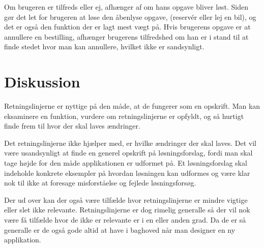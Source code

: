 \documentclass[a4paper]{article}
\begin{document}
Om brugeren er tilfreds eller ej, afhænger af om hans opgave bliver løst. Siden
gør det let for brugeren at løse den åbenlyse opgave, (reservér eller lej en
bil), og det er også den funktion der er lagt mest vægt på. Hvis brugerens
opgave er at annullere en bestilling, afhænger brugerens tilfredshed om han er i
stand til at finde stedet hvor man kan annullere, hvilket ikke er sandsynligt.

\section{Diskussion}

Retningslinjerne er nyttige på den måde, at de fungerer som en opskrift. Man kan
eksaminere en funktion, vurdere om retningslinjerne er opfyldt, og så hurtigt 
finde frem til hvor der skal laves ændringer. 

Det retningslinjerne ikke hjælper med, er hvilke ændringer der skal laves. 
Det vil være usandsynligt at finde en generel opskrift på løsningsforslag, 
fordi man skal tage højde for den måde applikationen er udformet på. Et 
løsningsforslag skal indeholde konkrete eksempler på hvordan løsningen
kan udformes og være klar nok til ikke at foresage misforståelse og 
fejlede løsningsforsøg.

Der ud over kan der også være tilfælde hvor retningslinjerne er mindre
vigtige eller slet ikke relevante. Retningslinjerne er dog rimelig
generalle så der vil nok være få tilfælde hvor de ikke er relevante er
i en eller anden grad. Da de er så generalle er de også gode altid at
have i baghoved når man designer en ny applikation.
\end{document}
